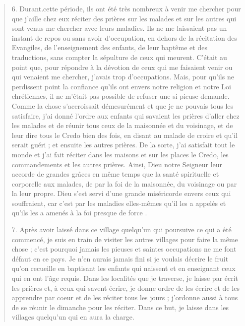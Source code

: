 \begin{quote}
6. Durant.cette période, ils ont été très nombreux à venir me
chercher pour que j'aille chez eux réciter des prières sur les malades
et sur les autres qui sont venus me chercher avec leurs maladies.
Ils ne me laissaient pas un instant de repos ou sans avoir
d'occupation, en dehors de la récitation des Evangiles, de l'enseignement
des enfants, de leur baptême et des traductions, sans
compter la sépulture de ceux qui meurent. C'était au point que,
pour répondre à la dévotion de ceux qui me faisaient venir ou qui
venaient me chercher, j'avais trop d'occupations. Mais, pour qu'ils
ne perdissent point la confiance qu'ils ont envers notre religion et
notre Loi chrétiennes, il ne m'était pas possible de refuser une si
 pieuse demande. Comme la chose s'accroissait démesurément et
que je ne pouvais tous les satisfaire, j'ai donné l'ordre aux enfants
qui savaient les prières d'aller chez les malades et de réunir tous
ceux de la maisonnée et du voisinage, et de leur dire tous le Credo
bien des fois, en disant au malade de croire et qu'il serait guéri ;
et ensuite les autres prières. De la sorte, j'ai satisfait tout le monde
et j'ai fait réciter dans les maisons et sur les places le Credo, les
commandements et les autres prières. Ainsi, Dieu notre Seigneur
leur accorde de grandes grâces en même temps que la santé spirituelle
et corporelle aux malades, de par la foi de la maisonnée, du
voisinage ou par la leur propre. Dieu s'est servi d'une grande miséricorde
envers ceux qui souffraient, car c'est par les maladies elles-mêmes
qu'il les a appelés et qu'ils les a amenés à la foi presque de
force .


7. Après avoir laissé dans ce village quelqu'un qui poursuive ce
qui a été commencé, je suis en train de visiter les autres villages
pour faire la même chose ; c'est pourquoi jamais les pieuses et saintes
occupations ne me font défaut en ce pays. Je n'en aurais jamais
fini si je voulais décrire le fruit qu'on recueille en baptisant les
enfants qui naissent et en enseignant ceux qui en ont l'âge requis.
Dans les localités que je traverse, je laisse par écrit les prières et,
à ceux qui savent écrire, je donne ordre de les écrire et de les
apprendre par coeur et de les réciter tous les jours ; j'ordonne aussi
à tous de se réunir le dimanche pour les réciter. Dans ce but, je
laisse dans les villages quelqu'un qui en aura la charge.



\end{quote}
